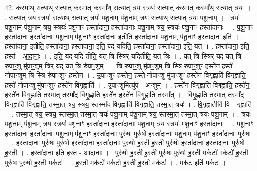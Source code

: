 \documentclass[17pt]{extarticle}
\begin{document}
42. कस्मा᳚थ् स॒त्याथ् स॒त्यात् कस्मा॒त् कस्मा᳚थ् स॒त्यात् त्रय॒ स्त्रयः॑ स॒त्यात् कस्मा॒त् कस्मा᳚थ् स॒त्यात् त्रयः॑ । . स॒त्यात् त्रय॒ स्त्रयः॑ स॒त्याथ् स॒त्यात् त्रयः॑ पशू॒नाम् प॑शू॒नाम् त्रयः॑ स॒त्याथ् स॒त्यात् त्रयः॑ पशू॒नाम् । . त्रयः॑ पशू॒नाम् प॑शू॒नाम् त्रय॒ स्त्रयः॑ पशू॒नाꣳ हस्ता॑दाना॒ हस्ता॑दानाः पशू॒नाम् त्रय॒ स्त्रयः॑ पशू॒नाꣳ हस्ता॑दानाः । . प॒शू॒नाꣳ हस्ता॑दाना॒ हस्ता॑दानाः पशू॒नाम् प॑शू॒नाꣳ हस्ता॑दाना॒ इतीति॒ हस्ता॑दानाः पशू॒नाम् प॑शू॒नाꣳ हस्ता॑दाना॒ इति॑ । . हस्ता॑दाना॒ इतीति॒ हस्ता॑दाना॒ हस्ता॑दाना॒ इति॒ यद् यदिति॒ हस्ता॑दाना॒ हस्ता॑दाना॒ इति॒ यत् । . हस्ता॑दाना॒ इति॒ हस्त॑ - आ॒दा॒नाः॒ । . इति॒ यद् यदि तीति॒ यत् त्रि स्त्रिर् यदितीति॒ यत् त्रिः । . यत् त्रि स्त्रिर् यद् यत् त्रि रु॑पाꣳ॒॒शु मु॑पाꣳ॒॒शुम् त्रिर् यद् यत् त्रि रु॑पाꣳ॒॒शुम् । . त्रि रु॑पाꣳ॒॒शु मु॑पाꣳ॒॒शुम् त्रि स्त्रि रु॑पाꣳ॒॒शुꣳ हस्ते॑न॒ हस्ते॑ नोपाꣳ॒॒शुम् त्रि स्त्रि रु॑पाꣳ॒॒शुꣳ हस्ते॑न । . उ॒पाꣳ॒॒शुꣳ हस्ते॑न॒ हस्ते॑ नोपाꣳ॒॒शु मु॑पाꣳ॒॒शुꣳ हस्ते॑न विगृ॒ह्णाति॑ विगृ॒ह्णाति॒ हस्ते॑
नोपाꣳ॒॒शु मु॑पाꣳ॒॒शुꣳ हस्ते॑न विगृ॒ह्णाति॑ । . उ॒पाꣳ॒॒शुमित्यु॑प - अꣳ॒॒शुम् । . हस्ते॑न विगृ॒ह्णाति॑ विगृ॒ह्णाति॒ हस्ते॑न॒ हस्ते॑न विगृ॒ह्णाति॒ तस्मा॒त् तस्मा᳚द् विगृ॒ह्णाति॒ हस्ते॑न॒ हस्ते॑न विगृ॒ह्णाति॒ तस्मा᳚त् । . वि॒गृ॒ह्णाति॒ तस्मा॒त् तस्मा᳚द् विगृ॒ह्णाति॑ विगृ॒ह्णाति॒ तस्मा॒त् त्रय॒ स्त्रय॒ स्तस्मा᳚द् विगृ॒ह्णाति॑ विगृ॒ह्णाति॒ तस्मा॒त् त्रयः॑ । . वि॒गृ॒ह्णातीति॑ वि - गृ॒ह्णाति॑ । . तस्मा॒त् त्रय॒ स्त्रय॒ स्तस्मा॒त् तस्मा॒त् त्रयः॑ पशू॒नाम् प॑शू॒नाम् त्रय॒ स्तस्मा॒त् तस्मा॒त् त्रयः॑ पशू॒नाम् । . त्रयः॑ पशू॒नाम् प॑शू॒नाम् त्रय॒ स्त्रयः॑ पशू॒नाꣳ हस्ता॑दाना॒ हस्ता॑दानाः पशू॒नाम् त्रय॒ स्त्रयः॑ पशू॒नाꣳ हस्ता॑दानाः । . प॒शू॒नाꣳ हस्ता॑दाना॒ हस्ता॑दानाः पशू॒नाम् प॑शू॒नाꣳ हस्ता॑दानाः॒ पुरु॑षः॒ पुरु॑षो॒ हस्ता॑दानाः पशू॒नाम् प॑शू॒नाꣳ हस्ता॑दानाः॒ पुरु॑षः । . हस्ता॑दानाः॒ पुरु॑षः॒ पुरु॑षो॒ हस्ता॑दाना॒ हस्ता॑दानाः॒ पुरु॑षो ह॒स्ती ह॒स्ती पुरु॑षो॒ हस्ता॑दाना॒ हस्ता॑दानाः॒ पुरु॑षो ह॒स्ती । . हस्ता॑दाना॒ इति॒ हस्त॑ - आ॒दा॒नाः॒ । . पुरु॑षो ह॒स्ती ह॒स्ती पुरु॑षः॒ पुरु॑षो ह॒स्ती म॒र्कटो॑ म॒र्कटो॑ ह॒स्ती पुरु॑षः॒ पुरु॑षो ह॒स्ती म॒र्कटः॑ । . ह॒स्ती म॒र्कटो॑ म॒र्कटो॑ ह॒स्ती ह॒स्ती म॒र्कटः॑ । . म॒र्कट॒ इति॑ म॒र्कटः॑ । \newline
\pagebreak
{}
\end{document}

